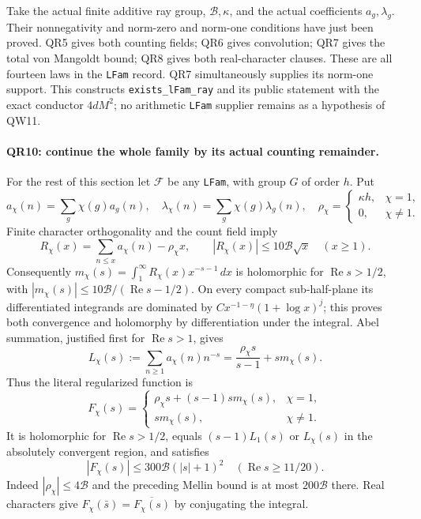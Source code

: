 Take the actual finite additive ray group, $\mathcal B,\kappa$, and
the actual coefficients $a_g,\lambda_g$. Their nonnegativity and
norm-zero and norm-one conditions have just been proved. QR5 gives
both counting fields; QR6 gives convolution; QR7 gives the total
von Mangoldt bound; QR8 gives both real-character clauses. These
are all fourteen laws in the \texttt{LFam} record. QR7 simultaneously
supplies its norm-one support. This constructs
\texttt{exists\_lFam\_ray} and its public statement with the exact
conductor $4dM^2$; no arithmetic \texttt{LFam} supplier remains
as a hypothesis of QW11.

\paragraph{QR10: continue the whole family by its actual counting remainder.}
For the rest of this section let $\mathcal F$ be any \texttt{LFam},
with group $G$ of order $h$. Put
\[
 a_\chi(n)=\sum_g\chi(g)a_g(n),\quad
 \lambda_\chi(n)=\sum_g\chi(g)\lambda_g(n),\quad
 \rho_\chi=\begin{cases}\kappa h,&\chi=1,\\0,&\chi\ne1.\end{cases}
\]
Finite character orthogonality and the count field imply
\[
 R_\chi(x)=\sum_{n\le x}a_\chi(n)-\rho_\chi x,
       \qquad |R_\chi(x)|\le10\mathcal B\sqrt x
                      \quad(x\ge1).                       \tag{QR.17}
\]
Consequently
$m_\chi(s)=\int_1^\infty R_\chi(x)x^{-s-1}\,dx$
is holomorphic for $\operatorname{Re}s>1/2$, with
$|m_\chi(s)|\le10\mathcal B/(\operatorname{Re}s-1/2)$.
On every compact sub-half-plane its differentiated integrands are
dominated by $C x^{-1-\eta}(1+\log x)^j$; this proves both convergence
and holomorphy by differentiation under the integral.
Abel summation, justified first for $\operatorname{Re}s>1$, gives
\[
 L_\chi(s):=\sum_{n\ge1}a_\chi(n)n^{-s}
       =\frac{\rho_\chi s}{s-1}+s m_\chi(s).              \tag{QR.18}
\]
Thus the literal regularized function is
\[
 F_\chi(s)=\begin{cases}
 \rho_\chi s+(s-1)s m_\chi(s),&\chi=1,\\
 s m_\chi(s),&\chi\ne1.
 \end{cases}                                               \tag{QR.19}
\]
It is holomorphic for $\operatorname{Re}s>1/2$, equals
$(s-1)L_1(s)$ or $L_\chi(s)$ in the absolutely convergent region,
and satisfies
\[
 |F_\chi(s)|\le300\mathcal B(|s|+1)^2
                    \quad(\operatorname{Re}s\ge11/20).    \tag{QR.20}
\]
Indeed $|\rho_\chi|\le4\mathcal B$ and the preceding Mellin bound
is at most $200\mathcal B$ there. Real characters give
$F_\chi(\bar s)=\overline{F_\chi(s)}$ by conjugating the integral.

